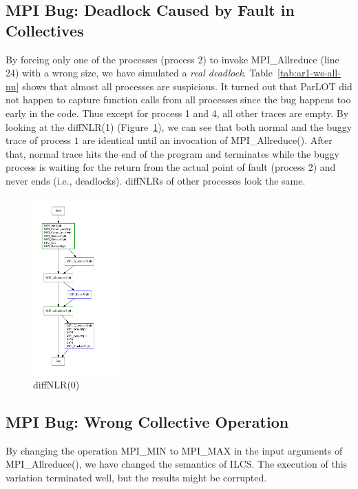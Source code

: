 \subsection{MPI Bug: Deadlock Caused by Fault in Collectives}
By forcing only one of the processes (process 2) to invoke MPI\_Allreduce (line 24) with a wrong size, we have simulated a \textit{real deadlock}. 
%
Table~\ref{tab:ar1-ws-all-nn} shows that almost all processes are suspicious.
%
It turned out that ParLOT did not happen to capture function calls from all processes since the bug happens too early in the code. Thus except for process 1 and 4, all other traces are empty.
%
By looking at the diffNLR(1) (Figure~\ref{diffNLR-0}), we can see that both normal and the buggy trace of process $1$ are identical until an invocation of MPI\_Allreduce(). After that, normal trace hits the end of the program and terminates while the buggy process is waiting for the return from the actual point of fault (process 2) and never ends (i.e., deadlocks). 
%
diffNLRs of other processes look the same.
%



\begin{figure}[]
\centering
\includegraphics[width=0.3\textwidth]{figs/diffNLR/mpiBug-all-nn.pdf}
\caption{diffNLR(0)}
\label{diffNLR-0}
\end{figure}
%



\subsection{MPI Bug: Wrong Collective Operation}
By changing the operation MPI\_MIN to MPI\_MAX in the input arguments of MPI\_Allreduce(), we have changed the semantics of ILCS. 
%
The execution of this variation terminated well, but the results might be corrupted.
%

